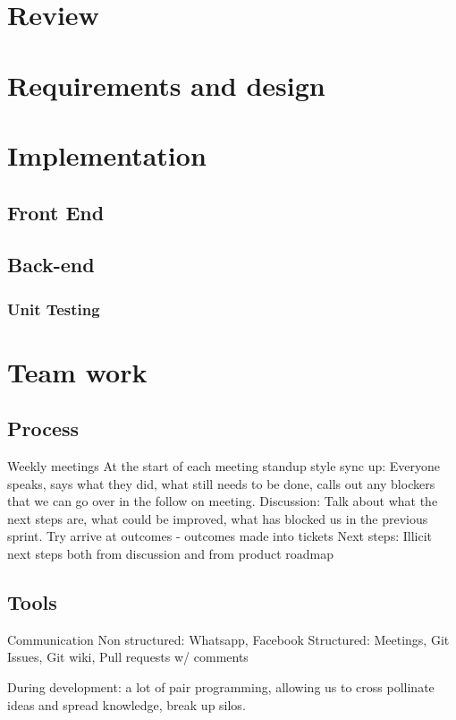 \documentclass{article}
\begin{document}
	\section{Review}
	\section{Requirements and design}
	\section{Implementation}
	\subsection{Front End}
	\subsection{Back-end}
	\subsubsection{Unit Testing}
	
	\section{Team work}
	
	
	\subsection{Process}
	Weekly meetings
	At the start of each meeting standup style sync up:
	Everyone speaks, says what they did, what still needs to be done, calls out any blockers that we can go over in the follow on meeting.
	Discussion: 
	Talk about what the next steps are, what could be improved, what has blocked us in the previous sprint. Try arrive at outcomes - outcomes made into tickets
	Next steps:
	Illicit next steps both from discussion and from product roadmap
	
	
	\subsection{Tools}
	Communication
	Non structured: Whatsapp, Facebook
	Structured: Meetings, Git Issues, Git wiki, Pull requests w/ comments
	
	During development: a lot of pair programming, allowing us to cross pollinate ideas and spread knowledge, break up silos.
	
\end{document}
